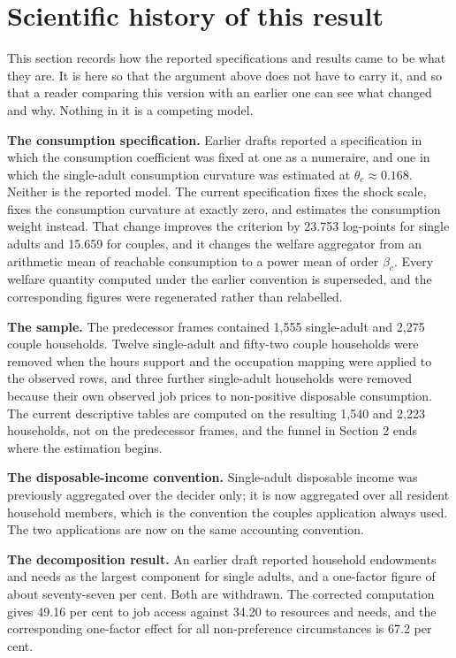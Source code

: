 \section{Scientific history of this result}\label{scientific-history-of-this-result}

This section records how the reported specifications and results came to be what they are. It is here so that the argument above does not have to carry it, and so that a reader comparing this version with an earlier one can see what changed and why. Nothing in it is a competing model.

\textbf{The consumption specification.} Earlier drafts reported a specification in which the consumption coefficient was fixed at one as a numeraire, and one in which the single-adult consumption curvature was estimated at \(\theta_c\approx0.168\). Neither is the reported model. The current specification fixes the shock scale, fixes the consumption curvature at exactly zero, and estimates the consumption weight instead. That change improves the criterion by 23.753 log-points for single adults and 15.659 for couples, and it changes the welfare aggregator from an arithmetic mean of reachable consumption to a power mean of order \(\beta_c\). Every welfare quantity computed under the earlier convention is superseded, and the corresponding figures were regenerated rather than relabelled.

\textbf{The sample.} The predecessor frames contained 1,555 single-adult and 2,275 couple households. Twelve single-adult and fifty-two couple households were removed when the hours support and the occupation mapping were applied to the observed rows, and three further single-adult households were removed because their own observed job prices to non-positive disposable consumption. The current descriptive tables are computed on the resulting 1,540 and 2,223 households, not on the predecessor frames, and the funnel in Section 2 ends where the estimation begins.

\textbf{The disposable-income convention.} Single-adult disposable income was previously aggregated over the decider only; it is now aggregated over all resident household members, which is the convention the couples application always used. The two applications are now on the same accounting convention.

\textbf{The decomposition result.} An earlier draft reported household endowments and needs as the largest component for single adults, and a one-factor figure of about seventy-seven per cent. Both are withdrawn. The corrected computation gives 49.16 per cent to job access against 34.20 to resources and needs, and the corresponding one-factor effect for all non-preference circumstances is 67.2 per cent.

